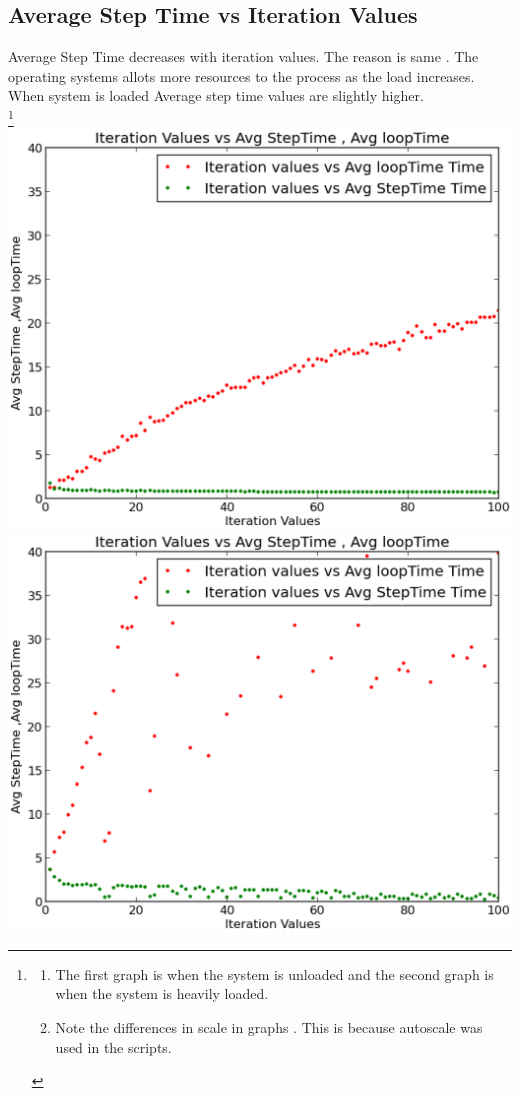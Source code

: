 \documentclass[a4paper,11pt]{report}
\begin{document}
 \subsection{Average Step Time vs Iteration Values}
Average Step Time decreases with iteration values. The reason is same . The operating systems allots more resources to the process as the load increases.\\
When system is loaded Average step time values are slightly higher. \\
\footnote
  { 
 \begin{enumerate}
   \item 
  The first graph is when the system is unloaded and the second graph is when the system is heavily loaded.
   \item
   Note the differences in scale in graphs . This is because autoscale was used in the scripts.
 \end{enumerate}
 }
\includegraphics[scale=.3]{doc/g12_plot01.eps}
\includegraphics[scale=.3]{doc/g12_plotload01.eps} \\
\end{document}

